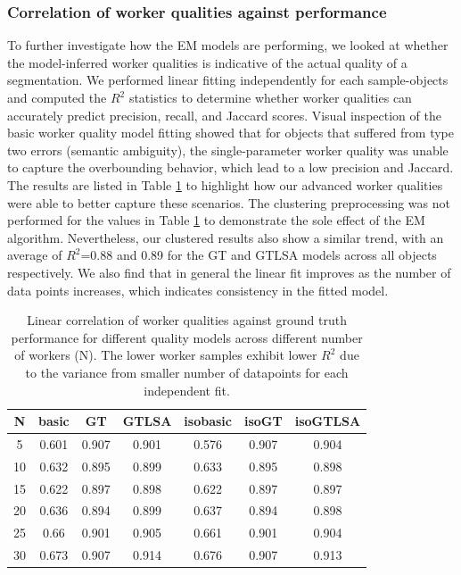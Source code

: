     \subsubsection{Correlation of worker qualities against performance}
     To further investigate how the EM models are performing, we looked at whether the model-inferred worker qualities is indicative of the actual quality of a segmentation. We performed linear fitting independently for each sample-objects and computed the $R^2$ statistics to determine whether worker qualities can accurately predict precision, recall, and Jaccard scores. Visual inspection of the basic worker quality model fitting showed that for objects that suffered from type two errors (semantic ambiguity), the single-parameter worker quality was unable to capture the overbounding behavior, which lead to a low precision and Jaccard. The results are listed in Table \ref{correlation} to highlight how our advanced worker qualities were able to better capture these scenarios. The clustering preprocessing was not performed for the values in Table \ref{correlation} to demonstrate the sole effect of the EM algorithm. Nevertheless, our clustered results also show a similar trend, with an average of $R^2$=0.88 and 0.89 for the GT and GTLSA models across all objects respectively. We also find that in general the linear fit improves as the number of data points increases, which indicates consistency in the fitted model.
    \begin{table}[ht!]
    \small
      \begin{tabular}{ccccccc}
        \hline
           N &   basic &   GT &   GTLSA &   isobasic &   isoGT &   isoGTLSA \\
        \hline
              5 &      0.601 &   0.907 &      0.901 &       0.576 &    0.907 &       0.904 \\
            10 &      0.632 &   0.895 &      0.899 &       0.633 &    0.895 &       0.898 \\
            15 &      0.622 &   0.897 &      0.898 &       0.622 &    0.897 &       0.897 \\
            20 &      0.636 &   0.894 &      0.899 &       0.637 &    0.894 &       0.898 \\
            25 &      0.66  &   0.901 &      0.905 &       0.661 &    0.901 &       0.904 \\
            30 &      0.673 &   0.907 &      \cellcolor{blue!25}0.914 &       0.676 &    0.907 &       \cellcolor{blue!25}0.913 \\
        \hline
      \end{tabular}
        \caption{Linear correlation of worker qualities against ground truth performance for different quality models across different number of workers (N). The lower worker samples exhibit lower $R^2$ due to the variance from smaller number of datapoints for each independent fit. }
        \label{correlation}
    \end{table}
    \vspace{-10pt}
